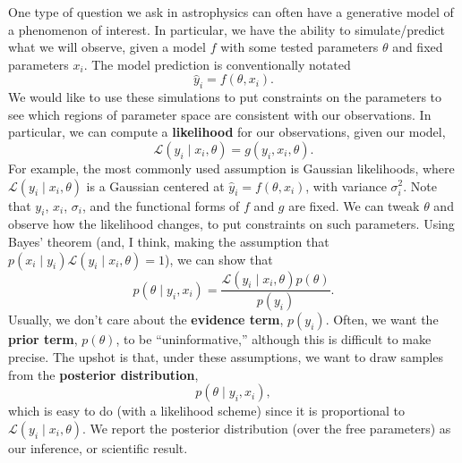 \documentclass[12pt,letterpaper]{article}
\begin{document}
One type of question we ask in astrophysics can often have a generative model of a phenomenon of interest. In particular, we have the ability to simulate/predict what we will observe, given a model $f$ with some tested parameters $\theta$ and fixed parameters $x_i$. The model prediction is conventionally notated
\[\hat y_i=f(\theta,x_i).\]
We would like to use these simulations to put constraints on the parameters to see which regions of parameter space are consistent with our observations. In particular, we can compute a \textbf{likelihood} for our observations, given our model,
\[\mathcal L(y_i\mid x_i,\theta)=g(y_i,x_i,\theta).\]
For example, the most commonly used assumption is Gaussian likelihoods, where $\mathcal L(y_i\mid x_i,\theta)$ is a Gaussian centered at $\hat y_i=f(\theta,x_i)$, with variance $\sigma_i^2$. Note that $y_i$, $x_i$, $\sigma_i$, and the functional forms of $f$ and $g$ are fixed. We can tweak $\theta$ and observe how the likelihood changes, to put constraints on such parameters. Using Bayes' theorem (and, I think, making the assumption that $p(x_i\mid y_i)\mathcal L(y_i\mid x_i,\theta)=1$), we can show that
\[p(\theta\mid y_i,x_i)=\frac{\mathcal L(y_i\mid x_i,\theta)p(\theta)}{p(y_i)}.\]
Usually, we don't care about the \textbf{evidence term}, $p(y_i)$. Often, we want the \textbf{prior term}, $p(\theta)$, to be ``uninformative,'' although this is difficult to make precise. The upshot is that, under these assumptions, we want to draw samples from the \textbf{posterior distribution},
\[p(\theta\mid y_i,x_i),\]
which is easy to do (with a likelihood scheme) since it is proportional to $\mathcal L(y_i\mid x_i,\theta)$. We report the posterior distribution (over the free parameters) as our inference, or scientific result.
\end{document}

